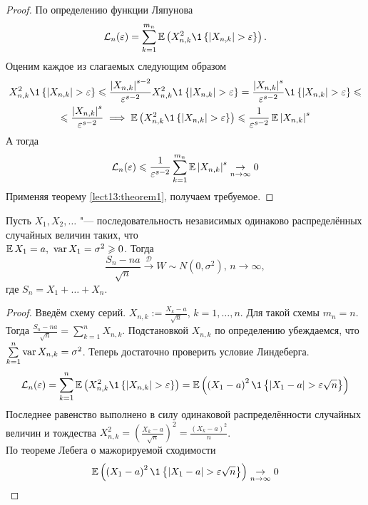 \begin{proof}
По определению функции Ляпунова
$$
\mathcal{L}_n(\eps) = \sum_{k = 1}^{m_n}\E\left(X_{n, k}^2 \1\left\{\left|X_{n, k}\right| > \eps\right\}\right).
$$
Оценим каждое из слагаемых следующим образом
\begin{multline*}
X_{n, k}^2 \1\left\{\left|X_{n, k}\right| > \eps\right\} \leqslant \frac{\left|X_{n, k}\right|^{s-2}}{\eps^{s-2}} X_{n, k}^2 \1\left\{\left|X_{n, k}\right| > \eps\right\} = \frac{\left|X_{n, k}\right|^s}{\eps^{s-2}}\1\left\{\left|X_{n, k}\right| > \eps\right\}\leqslant
\\
\leqslant \frac{\left|X_{n, k}\right|^s}{\eps^{s-2}} \implies \E\left(X_{n, k}^2 \1\left\{\left|X_{n, k}\right| > \eps\right\}\right) \leqslant \frac{1}{\eps^{s-2}}\E\left|X_{n, k}\right|^s
\end{multline*}
А тогда
$$
\mathcal{L}_n(\varepsilon) \leqslant \frac{1}{\varepsilon^{s-2}}\sum\limits_{k = 1}^{m_n}\operatorname*{\mathbb{E}} \left|X_{n, k}\right|^s \underset{n \to \infty}{\to} 0
$$
Применяя теорему \ref{lect13:theorem1}, получаем требуемое.
\end{proof}
\begin{theorem}\label{lect13:theorem4}
Пусть $X_1, X_2, \ldots$ "--- последовательность независимых одинаково распределённых случайных величин таких, что \\$\operatorname*{\mathbb{E}} X_1 = a,~\operatorname*{var} X_1 = \sigma^2 \geqslant 0$. Тогда 
$$
\frac{S_n - na}{\sqrt{n}} \overset{\mathcal{D}}{\to} W \sim N(0, \sigma^2), \, n \to \infty,
$$
где $S_n = X_1 + \ldots + X_n$.
\end{theorem}
\begin{proof}
Введём схему серий. $X_{n, k} := \frac{X_k - a}{\sqrt{n}}, \, k = 1, \ldots, n$. Для такой схемы $m_n = n$. Тогда $\frac{S_n - na}{\sqrt{n}} = \sum\limits_{k = 1}^n X_{n, k}$. Подстановкой $X_{n, k}$ по определению убеждаемся, что $\sum\limits_{k = 1}^n \operatorname*{var} X_{n, k} = \sigma^2$. Теперь достаточно проверить условие Линдеберга.  
$$
\mathcal{L}_n(\eps) = \sum\limits_{k = 1}^n \E \left(X_{n, k}^2 \1\left\{\left|X_{n, k}\right| > \eps\right\}\right)  =\E\left(\left(X_1 - a\right)^2\1\left\{\left|X_1 - a\right| > \eps\sqrt{n}\right\}\right)
$$
Последнее равенство выполнено в силу одинаковой распределённости случайных величин и тождества $X_{n, k}^2 = \left(\frac{X_k - a}{\sqrt{n}}\right)^2 = \frac{(X_k - a)^2}{n}$. \\По теореме Лебега о мажорируемой сходимости
$$
\E\left(\left(X_1 - a\right)^2\1\left\{\left|X_1 - a\right| > \eps\sqrt{n}\right\}\right) \underset{n \to \infty}{\to} 0
$$
\end{proof}
